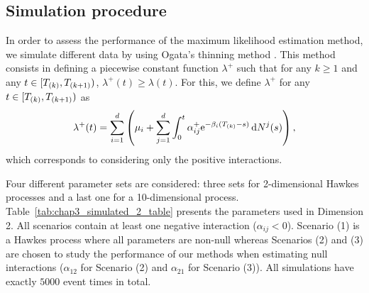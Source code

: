     \subsection{Simulation procedure}
    In order to assess the performance of the maximum likelihood estimation method, we simulate different data by using Ogata's thinning method \parencite{Ogata1981}. This method consists in defining a piecewise constant function $\lambda^+$ such that for any $k\geq1$ and any $t\in[T\park, T\park[k+1])$, $\lambda^+(t) \geq \lambda(t)$. For this, we define $\lambda^+$ for any $t\in[T\park, T\park[k+1])$ as \[\lambda^+(t) = \sum_{i=1}^{d}{\left(\mu_i + \sum_{j=1}^{d}\int_{0}^{t}{\alpha_{ij}^+\mathrm{e}^{-\beta_i(T\park-s)}\,\mathrm{d}N^j(s)}\right)}\,,\] which corresponds to considering only the positive interactions.

    Four different parameter sets are considered: three sets for 2-dimensional Hawkes processes and a last one for a 10-dimensional process.
    Table~\ref{tab:chap3_simulated_2_table} presents the parameters used in Dimension 2. All scenarios contain at least one negative interaction ($\alpha_{ij}<0$). Scenario (1) is a Hawkes process where all parameters are non-null whereas Scenarios (2) and (3) are chosen to study the performance of our methods when estimating null interactions ($\alpha_{12}$ for Scenario (2) and $\alpha_{21}$ for Scenario (3)).
    All simulations have exactly \(5000\) event times in total.
